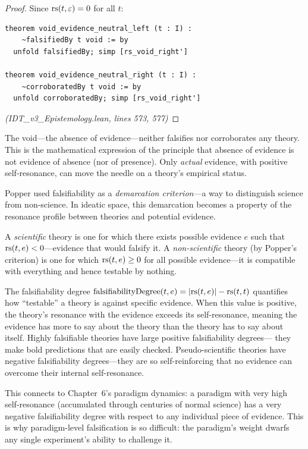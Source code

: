 \begin{proof}
Since $\mathrm{rs}(t, \varepsilon) = 0$ for all $t$:
\begin{lstlisting}
theorem void_evidence_neutral_left (t : I) :
    ~falsifiedBy t void := by
  unfold falsifiedBy; simp [rs_void_right']

theorem void_evidence_neutral_right (t : I) :
    ~corroboratedBy t void := by
  unfold corroboratedBy; simp [rs_void_right']
\end{lstlisting}
\textit{(IDT\_v3\_Epistemology.lean, lines 573, 577)}
\end{proof}

\begin{interpretation}
The void---the absence of evidence---neither falsifies nor corroborates any
theory. This is the mathematical expression of the principle that absence of
evidence is not evidence of absence (nor of presence). Only \emph{actual}
evidence, with positive self-resonance, can move the needle on a theory's
empirical status.
\end{interpretation}

\begin{remark}
Popper used falsifiability as a \emph{demarcation criterion}---a way to distinguish
science from non-science. In ideatic space, this demarcation becomes a property of
the resonance profile between theories and potential evidence.

A \emph{scientific} theory is one for which there exists possible evidence $e$
such that $\mathrm{rs}(t, e) < 0$---evidence that would falsify it. A \emph{non-scientific}
theory (by Popper's criterion) is one for which $\mathrm{rs}(t, e) \geq 0$ for all
possible evidence---it is compatible with everything and hence testable by nothing.

The falsifiability degree $\mathrm{falsifiabilityDegree}(t, e) = |\mathrm{rs}(t, e)| - \mathrm{rs}(t, t)$
quantifies how ``testable'' a theory is against specific evidence. When this value
is positive, the theory's resonance with the evidence exceeds its self-resonance,
meaning the evidence has more to say about the theory than the theory has to say
about itself. Highly falsifiable theories have large positive falsifiability degrees---
they make bold predictions that are easily checked. Pseudo-scientific theories have
negative falsifiability degrees---they are so self-reinforcing that no evidence can
overcome their internal self-resonance.

This connects to Chapter~6's paradigm dynamics: a paradigm with very high
self-resonance (accumulated through centuries of normal science) has a very
negative falsifiability degree with respect to any individual piece of evidence.
This is why paradigm-level falsification is so difficult: the paradigm's weight
dwarfs any single experiment's ability to challenge it.
\end{remark}


